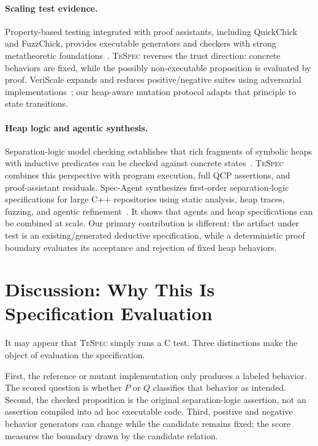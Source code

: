 \documentclass[10pt]{article}
\newcommand{\tespec}{\textsc{TeSpec}}
\begin{document}
\paragraph{Scaling test evidence.}
Property-based testing integrated with proof assistants, including
QuickChick and FuzzChick, provides executable generators and checkers with
strong metatheoretic foundations~\citep{paraskevopoulou2015quickchick,lampropoulos2019fuzzchick}.
\tespec{} reverses the trust direction: concrete behaviors are fixed, while the
possibly non-executable proposition is evaluated by proof.  VeriScale expands
and reduces positive/negative suites using adversarial
implementations~\citep{bai2026veriscale}; our heap-aware mutation protocol
adapts that principle to state transitions.

\paragraph{Heap logic and agentic synthesis.}
Separation-logic model checking establishes that rich fragments of symbolic
heaps with inductive predicates can be checked against concrete
states~\citep{brotherston2016model}.  \tespec{} combines this perspective with
program execution, full QCP assertions, and proof-assistant residuals.
Spec-Agent synthesizes first-order separation-logic specifications for large
C++ repositories using static analysis, heap traces, fuzzing, and agentic
refinement~\citep{suresh2026agentic}.  It shows that agents and heap
specifications can be combined at scale.  Our primary contribution is
different: the artifact under test is an existing/generated deductive
specification, while a deterministic proof boundary evaluates its acceptance
and rejection of fixed heap behaviors.

\section{Discussion: Why This Is Specification Evaluation}

It may appear that \tespec{} simply runs a C test.  Three distinctions make the
object of evaluation the specification.

First, the reference or mutant implementation only produces a labeled behavior.
The scored question is whether $P$ or $Q$ classifies that behavior as intended.
Second, the checked proposition is the original separation-logic assertion,
not an assertion compiled into ad hoc executable code.  Third, positive and
negative behavior generators can change while the candidate remains fixed;
the score measures the boundary drawn by the candidate relation.
\end{document}
